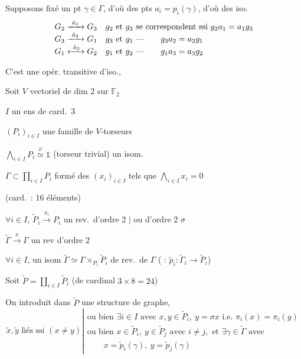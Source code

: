 \documentclass[11pt,a4paper]{article}
\begin{document}
Supposons fixé un pt $\gamma \in \Gamma$, d'où des pts $a_i = p_i(\gamma)$,
d'où des iso.
\[
\begin{array}{ll}
G_2 \xrightarrow{\ \tilde a_1\ } G_3 & g_2 \text{ et } g_3 \text{ se correspondent ssi } g_2 a_1 = a_1 g_3 \\
G_3 \xrightarrow{\ \tilde a_2\ } G_1 & g_3 \text{ et } g_1 \ \text{---} \qquad g_3 a_2 = a_2 g_1 \\
G_1 \xleftrightarrow{\ \tilde a_3\ } G_2 & g_1 \text{ et } g_2 \ \text{---} \qquad g_1 a_3 = a_3 g_2
\end{array}
\]

C'est une opér. transitive d'iso., \ill{}

Soit $V$ vectoriel de dim 2 sur $\mathbb{F}_2$

$I$ un ens de card.\ 3

$(P_i)_{i \in I}$ une famille de $V$-torseurs

$\bigwedge_{i \in I} P_i \overset{\varphi}{\simeq} \mathbb{1}$ (torseur trivial) un isom.

$\Gamma \subset \prod_{i \in I} P_i$ formé des $(x_i)_{i \in I}$ tels que
$\bigwedge_{i \in I} x_i = 0$

\quad (card.\ : 16 éléments)

$\forall i \in I$, $\tilde P_i \xrightarrow{\ \pi_i\ } P_i$ un rev.\ d'ordre 2
\quad $\Big|$ ou  d'ordre 2  $\sigma$

$\tilde\Gamma \xrightarrow{\ \pi\ } \Gamma$ un rev d'ordre 2

$\forall i \in I$, un isom
$\tilde\Gamma \simeq \Gamma \times_{P_i} \tilde P_i$ de rev.\ de $\Gamma$
\struck{\ill{}} ( : $\tilde p_i : \tilde\Gamma_i \to \tilde P_i$)

Soit $\tilde P = \coprod_{i \in I} \tilde P_i$ \quad (de cardinal $3 \times 8 = 24$)

On introduit dans $\tilde P$ une structure de graphe,
\[
\tilde x, \tilde y \text{ liés ssi } (x \neq y)
\left|
\begin{array}{l}
\text{ou bien } \exists i \in I \text{ avec } x, y \in \tilde P_i,\ y = \sigma x \text{ i.e. } \pi_i(x) = \pi_i(y) \\
\text{ou bien } x \in \tilde P_i,\ y \in \tilde P_j \text{ avec } i \neq j, \text{ et } \exists \gamma \in \tilde\Gamma \text{ avec} \\
\qquad x = \tilde p_i(\gamma),\ y = \tilde p_j(\gamma)
\end{array}
\right.
\]
\end{document}
